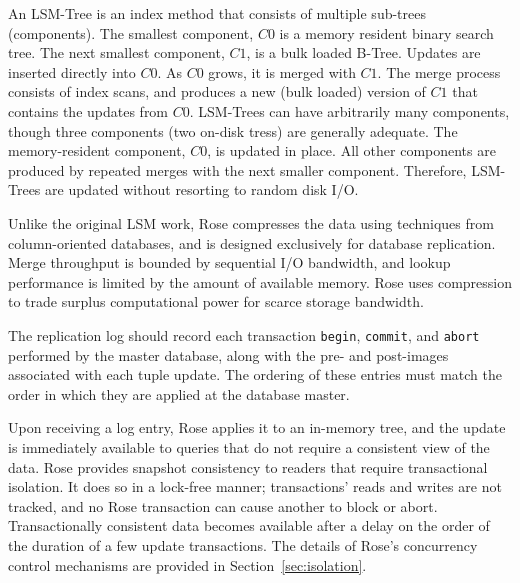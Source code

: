 \documentclass{vldb}
\newcommand{\rows}{Rose\xspace}
\newcommand{\rowss}{Rose's\xspace}
\begin{document}
An LSM-Tree is an index method that consists of multiple sub-trees
(components).  The smallest component, $C0$ is a memory resident
binary search tree.  The next smallest component, $C1$, is a bulk
loaded B-Tree.  Updates are inserted directly into $C0$.  As $C0$ grows,
it is merged with $C1$.  The merge process consists of index scans,
and produces a new (bulk loaded) version of $C1$ that contains the
updates from $C0$.  LSM-Trees can have arbitrarily many components,
though three components (two on-disk tress) are generally adequate.
The memory-resident component, $C0$, is updated in place.  All other
components are produced by repeated merges with the next smaller
component.  Therefore, LSM-Trees are updated without resorting to
random disk I/O.

Unlike the original LSM work, \rows compresses the data using
techniques from column-oriented databases, and is designed exclusively
for database replication.  Merge throughput is bounded by sequential
I/O bandwidth, and lookup performance is limited by the amount of
available memory.  \rows uses compression to trade surplus
computational power for scarce storage bandwidth.

The replication log should record each transaction {\tt begin}, {\tt commit}, and
{\tt abort} performed by the master database, along with the pre- and
post-images associated with each tuple update.  The ordering of these
entries must match the order in which they are applied at the
database master.

Upon receiving a log entry, \rows applies it to an in-memory tree, and
the update is immediately available to queries that do not require a
consistent view of the data.  \rows provides snapshot consistency to
readers that require transactional isolation.  It does so in a
lock-free manner; transactions' reads and writes are not tracked, and
no \rows transaction can cause another to block or abort.  
Transactionally consistent data becomes available after
a delay on the order of the duration of a few update transactions.
The details of \rowss concurrency control mechanisms are provided in
Section~\ref{sec:isolation}.

\end{document}
